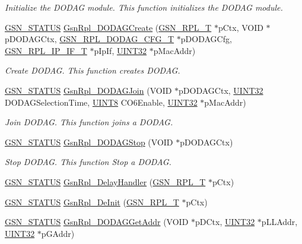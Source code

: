 \begin{DoxyCompactItemize}
\begin{DoxyCompactList}\small\item\em Initialize the DODAG module. This function initializes the DODAG module. \end{DoxyCompactList}\item 
\hyperlink{a00660_gada5951904ac6110b1fa95e51a9ddc217}{GSN\_\-STATUS} \hyperlink{a00579_a29418e6af61ea39a5f66d2a8153dd40c}{GsnRpl\_\-DODAGCreate} (\hyperlink{a00192}{GSN\_\-RPL\_\-T} $\ast$pCtx, VOID $\ast$pDODAGCtx, \hyperlink{a00199}{GSN\_\-RPL\_\-DODAG\_\-CFG\_\-T} $\ast$pDODAGCfg, \hyperlink{a00203}{GSN\_\-RPL\_\-IP\_\-IF\_\-T} $\ast$pIpIf, \hyperlink{a00660_gae1e6edbbc26d6fbc71a90190d0266018}{UINT32} $\ast$pMacAddr)
\begin{DoxyCompactList}\small\item\em Create DODAG. This function creates DODAG. \end{DoxyCompactList}\item 
\hyperlink{a00660_gada5951904ac6110b1fa95e51a9ddc217}{GSN\_\-STATUS} \hyperlink{a00579_a9ceb4263e3256a6d6680835eb1ee7e46}{GsnRpl\_\-DODAGJoin} (VOID $\ast$pDODAGCtx, \hyperlink{a00660_gae1e6edbbc26d6fbc71a90190d0266018}{UINT32} DODAGSelectionTime, \hyperlink{a00660_gab27e9918b538ce9d8ca692479b375b6a}{UINT8} CO6Enable, \hyperlink{a00660_gae1e6edbbc26d6fbc71a90190d0266018}{UINT32} $\ast$pMacAddr)
\begin{DoxyCompactList}\small\item\em Join DODAG. This function joins a DODAG. \end{DoxyCompactList}\item 
\hyperlink{a00660_gada5951904ac6110b1fa95e51a9ddc217}{GSN\_\-STATUS} \hyperlink{a00579_a997ed264ac34b60c35144441237720c5}{GsnRpl\_\-DODAGStop} (VOID $\ast$pDODAGCtx)
\begin{DoxyCompactList}\small\item\em Stop DODAG. This function Stop a DODAG. \end{DoxyCompactList}\item 
\hyperlink{a00660_gada5951904ac6110b1fa95e51a9ddc217}{GSN\_\-STATUS} \hyperlink{a00579_a2b617f0982bcfda267fb3afb4f3a4edc}{GsnRpl\_\-DelayHandler} (\hyperlink{a00192}{GSN\_\-RPL\_\-T} $\ast$pCtx)
\item 
\hyperlink{a00660_gada5951904ac6110b1fa95e51a9ddc217}{GSN\_\-STATUS} \hyperlink{a00579_a9cd8938babbce0aec017ed5b3ec33a92}{GsnRpl\_\-DeInit} (\hyperlink{a00192}{GSN\_\-RPL\_\-T} $\ast$pCtx)
\item 
\hyperlink{a00660_gada5951904ac6110b1fa95e51a9ddc217}{GSN\_\-STATUS} \hyperlink{a00579_a6073f0f7a6aabf2db1f5c04266bcc82e}{GsnRpl\_\-DODAGGetAddr} (VOID $\ast$pDCtx, \hyperlink{a00660_gae1e6edbbc26d6fbc71a90190d0266018}{UINT32} $\ast$pLLAddr, \hyperlink{a00660_gae1e6edbbc26d6fbc71a90190d0266018}{UINT32} $\ast$pGAddr)
\end{DoxyCompactItemize}


